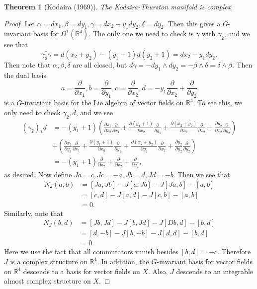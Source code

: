\documentclass[leqno, openany]{memoir}
\newtheorem{thm}{Theorem}[chapter]
\theoremstyle{definition}
\theoremstyle{remark}
\theoremstyle{plain}
\theoremstyle{definition}
\theoremstyle{remark}
\newcommand{\R}{\mathbb{R}}
\begin{document}
\begin{thm}[Kodaira (1969)]
    The Kodaira-Thurston manifold is complex.
\end{thm}

\begin{proof}
    Let $\alpha = dx_1, \beta = dy_1, \gamma = dx_2 - y_1 dy_2, \delta = dy_2$. Then this gives a $G$-invariant basis for $\Omega^1(\R^4)$. The only one we need to check is $\gamma$ with $\gamma_2$, and we see that
    \[ \gamma_2^* \gamma = d(x_2 + y_2) - (y_1 + 1)d (y_2 + 1) = dx_2 - y_1 dy_2. \]
    Then note that $\alpha, \beta, \delta$ are all closed, but $d \gamma = -dy_1 \wedge dy_2 = - \beta \wedge \delta = \delta \wedge \beta$.
    Then the dual basis
    \[ a = \frac{\partial}{\partial x_1}, b = \frac{\partial}{\partial y_1}, c = \frac{\partial}{\partial x_2}, d = -y_1 \frac{\partial}{\partial x_2} + \frac{\partial}{\partial y_2} \] 
    is a $G$-invariant basis for the Lie algebra of vector fields on $\R^4$. To see this, we only need to check $\gamma_2, d$, and we see
    \begin{align*}
        (\gamma_2)_* d &= -(y_1 + 1) \left( \frac{\partial x_1 }{\partial x_2} \frac{\partial}{\partial x_1} + \frac{\partial (y_1 + 1)}{\partial x_2} \frac{\partial}{\partial y_1} + \frac{\partial (x_2 + y_2)}{\partial x_2} \frac{\partial}{\partial x_2} + \frac{\partial y_2}{\partial x_2} \frac{\partial}{\partial y_2} \right) \\
                       &+ \left( \frac{\partial x_1 }{\partial y_2} \frac{\partial}{\partial x_1} + \frac{\partial (y_1 + 1)}{\partial x_y} \frac{\partial}{\partial y_1} + \frac{\partial (x_2 + y_2)}{\partial y_2} \frac{\partial}{\partial x_2} + \frac{\partial y_2}{\partial y_2} \frac{\partial}{\partial y_2} \right) \\
                       &= -(y_1 + 1) \frac{\partial}{\partial x_2} + \frac{\partial}{\partial x_2} + \frac{\partial}{\partial y_2},
    \end{align*}
    as desired. Now define $Ja = c, Jc = -a, Jb = d, Jd = -b$. Then we see that 
    \begin{align*}
        N_J(a,b) &= [Ja, Jb] - J[a,Jb] - J[Ja,b] - [a,b] \\
                 &= [c,d] - J[a,d] - J[c,b] - [a,b] \\
                 &= 0.
    \end{align*}
    Similarly, note that
    \begin{align*}
        N_J(b,d) &= [Jb, Jd] - J[b,Jd] - J[Db,d] - [b,d] \\
                 &= [d,-b] - J[b,-b] - J[d,d] - [b,d] \\
                 &= 0.
    \end{align*}
    Here we use the fact that all commutators vanish besides $[b,d] = -c$. Therefore $J$ is a complex structure on $\R^4$. In addition, the $G$-invariant basis for vector fields on $\R^4$ descends to a basis for vector fields on $X$. Also, $J$ descends to an integrable almost complex structure on $X$.
\end{proof}
\end{document}
